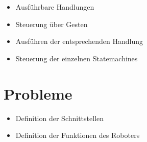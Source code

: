 \begin{itemize}
\item Ausführbare Handlungen
\item Steuerung über Gesten
\item Ausführen der entsprechenden Handlung
\item Steuerung der einzelnen Statemachines
\end{itemize}

\section{Probleme}
\label{probleme_integration_sec}

\begin{itemize}
\item Definition der Schnittstellen
\item Definition der Funktionen des Roboters
\end{itemize}
